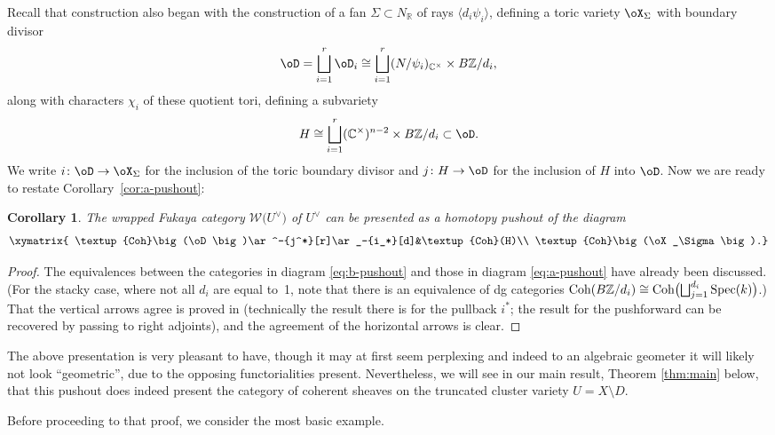 \documentclass[10pt,a4paper]{amsart}
\numberwithin{equation}{section}
\newtheorem{Corollary}[Theorem]{Corollary}
\def\CC{\mathbb{C}}
\def\RR{\mathbb{R}}
\def\ZZ{\mathbb{Z}}
\def\cW{\mathcal{W}}
\newcommand{\Coh}{\textup{Coh}}
\newcommand\Spec{\textup{Spec}}
\begin{document}
Recall that construction also began with the construction of a fan $\Sigma\subset N_\RR$ of rays $\langle d_i\psi_i\rangle$, defining a toric variety $\oX_\Sigma$ with boundary divisor
\[
\oD=\bigsqcup_{i=1}^r \oD_i\cong \bigsqcup_{i=1}^r(N/\psi_i)_{\CC^\times}\times B\ZZ/d_i,
\]
along with characters $\chi_i$ of these quotient tori,
defining a subvariety
\[
H\cong \bigsqcup_{i=1}^r (\CC^\times)^{n-2}\times B\ZZ/d_i\subset \oD.
\]
We write $i\colon\oD\to \oX_\Sigma$ for the inclusion of the toric boundary divisor and $j\colon H\to \oD$ for the inclusion of $H$ into $\oD$. Now we are ready to restate Corollary~\ref{cor:a-pushout}:
\begin{Corollary}\label{cor:b-pushout}
 The wrapped Fukaya category $\cW\big(U^\vee\big)$ of $U^\vee$ can be presented as a homotopy pushout of the diagram
 \begin{equation}
 \xymatrix{
 \Coh\big(\oD\big)\ar^-{j^*}[r]\ar_-{i_*}[d]&\Coh(H)\\
 \Coh\big(\oX_\Sigma\big).}
 \label{eq:b-pushout}
 \end{equation}
\end{Corollary}
\begin{proof}
 The equivalences between the categories in diagram \eqref{eq:b-pushout} and those in diagram \eqref{eq:a-pushout} have already been discussed. \big(For the stacky case, where not all $d_i$ are equal to~1, note that there is an equivalence of dg categories $\Coh(B\ZZ/d_i)\cong \Coh\bigl( \bigsqcup_{j=1}^{d_i}\Spec(k) \bigr)$.\big) That the vertical arrows agree is proved in \cite[Section~7.2]{GS17} (technically the result there is for the pullback $i^*$; the result for the pushforward can be recovered by passing to right adjoints), and the agreement of the horizontal arrows is clear.
\end{proof}
The above presentation is very pleasant to have, though it may at first seem perplexing and indeed to an algebraic geometer it will likely not look ``geometric'', due to the opposing functorialities present. Nevertheless, we will see in our main result, Theorem \ref{thm:main} below, that this pushout does indeed present the category of coherent sheaves on the truncated cluster variety $U=X\setminus D$.

Before proceeding to that proof, we consider the most basic example.
\end{document}
